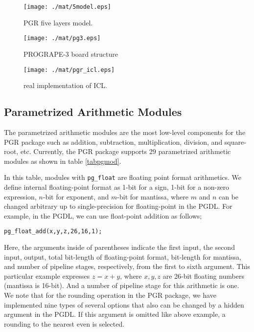 \documentclass[times, 10pt,twocolumn]{article}
\begin{document}
\begin{figure}[htb]
\begin{center}
\texttt{[image: ./mat/5model.eps]}
\caption{PGR five layers model.}
\label{fig5model}
\end{center}
\end{figure}

\begin{figure}[htb]
\begin{center}
\texttt{[image: ./mat/pg3.eps]}
\caption{PROGRAPE-3 board structure}
\label{figpg3}
\end{center}
\end{figure}

\begin{figure}[htb]
\begin{center}
\texttt{[image: ./mat/pgr\_icl.eps]}
\caption{real implementation of ICL.}
\label{figicl}
\end{center}
\end{figure}

\subsection{Parametrized Arithmetic Modules}
The parametrized arithmetic modules are the most low-level components
for the PGR package such as addition, subtraction, 
multiplication, division, and square-root, etc. 
Currently, the PGR package supports
29 parametrized arithmetic modules as shown in table \ref{tabpgmod}.

In this table, modules with {\tt pg\_float} are floating point format arithmetics.
We define internal floating-point format as 1-bit for a sign, 
1-bit for a non-zero expression, $n$-bit for exponent, 
and $m$-bit for mantissa, where $m$ and $n$ can be 
changed arbitrary up to single-precision for floating-point in the PGDL.
For example, in the PGDL, we can use float-point addition
as follows;
\begin{verbatim}
pg_float_add(x,y,z,26,16,1);
\end{verbatim}
Here, the arguments inside of parentheses indicate
the first input, the second input, output, total bit-length
of floating-point format, bit-length for mantissa,
and number of pipeline stages, respectively,
from the first to sixth argument.
This particular example expresses 
$z = x + y$, where $x,y,z$ are 26-bit floating numbers (mantissa is 16-bit).
And a number of pipeline stage for this arithmetic is one.
We note that for the rounding operation in the PGR package,
we have implemented nine types of several options that
also can be changed by a hidden argument in the PGDL.
If this argument is omitted like above example, 
a rounding to the nearest even is selected.
\end{document}
